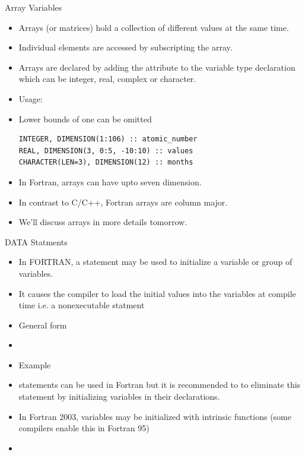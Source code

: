 \documentclass[10pt,t]{beamer}
\begin{document}
\begin{frame}[fragile]{Array Variables}
  \begin{itemize}
    \item Arrays (or matrices) hold a collection of different values at the same time.
    \item Individual elements are accessed by subscripting the array.
    \item Arrays are declared by adding the  attribute to the variable type declaration which can be integer, real, complex or character.
    \item Usage: 
    \item[] Lower bounds of one can be omitted
      \begin{lstlisting}[language={[90]Fortran}]
INTEGER, DIMENSION(1:106) :: atomic_number
REAL, DIMENSION(3, 0:5, -10:10) :: values
CHARACTER(LEN=3), DIMENSION(12) :: months
      \end{lstlisting}
    \item In Fortran, arrays can have upto seven dimension.
    \item In contrast to C/C++, Fortran arrays are column major.
    \item We'll discuss arrays in more details tomorrow.
  \end{itemize}
\end{frame}

\begin{frame}{DATA Statments}
  \begin{itemize}
    \item In FORTRAN, a  statement may be used to initialize a variable or group of variables.
    \item It causes the compiler to load the initial values into the variables at compile time i.e. a nonexecutable statment
    \item General form
    \item[] 
    \item[] Example 
    \item {} statements can be used in Fortran but it is recommended to to eliminate this statement by initializing variables in their declarations.
    \item In Fortran 2003, variables may be initialized with intrinsic functions (some compilers enable this in Fortran 95)
    \item[] 
  \end{itemize}
\end{frame}
\end{document}
